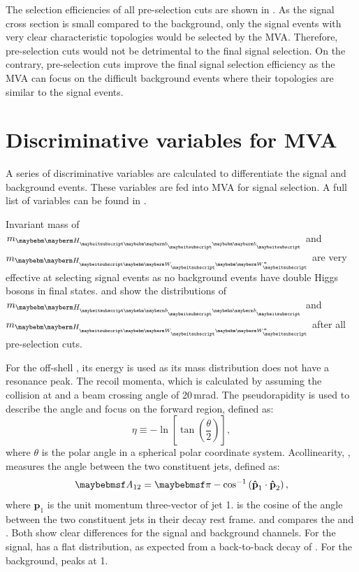 The selection efficiencies of all pre-selection cuts are shown in . As the signal cross section is small compared to the background, only the signal events with very clear characteristic topologies would be selected by the MVA. Therefore, pre-selection cuts would not be detrimental to the final signal selection. On the contrary, pre-selection cuts improve the final signal selection efficiency as the MVA can focus on the difficult background events where their topologies are similar to the signal events.


\section{Discriminative variables for MVA}

A series of discriminative variables are calculated to differentiate the signal and background events. These variables are fed into MVA for signal selection. A full list of variables can be found in .

Invariant mass of $m_{\Hbb}$ and $m_{\HWW}$ are very effective at selecting signal events as no background events have double Higgs bosons in final states.  and  show the distributions of $m_{\Hbb}$ and $m_{\HWW}$ after all pre-selection cuts.

For the off-shell \W*, its energy is used as its mass distribution does not have a resonance peak. The recoil momenta, which is calculated by assuming the collision at \sqrtS and a beam crossing angle of 20\,mrad. The pseudorapidity is used to describe the angle and focus on the forward region, defined as:
\begin{equation}
\eta \equiv  - \ln \left[ \tan \left( \frac{\theta}{2} \right) \right],
\end{equation}
where $\theta$ is the polar angle in a spherical polar coordinate system. Acollinearity, , measures the angle between the two constituent jets, defined as:
\begin{equation}
\acolinearity{12} = \pi - \cos^{-1}\left(\textbf{\^{p}}_1\cdot\textbf{\^{p}}_2\right),
\end{equation}
where $\textbf{\^{p}}_1$ is the unit momentum three-vector of jet 1.  is the cosine of the angle between the two constituent jets in their decay rest frame.  and  compares the \acolinearity{\Hbb} and  \cosStar{\Hbb}. Both show clear differences for the signal and background channels. For the signal, \cosStar{\Hbb} has a flat distribution, as expected from a back-to-back decay of \HepProcess{\PHiggs \to \Pbottom \APbottom}. For the background, \cosStar{\Hbb} peaks at 1.


